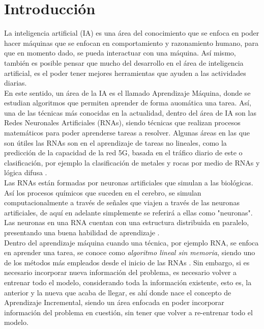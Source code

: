 \chapter{Introducción}
  La inteligencia artificial (IA) es una área del conocimiento que se enfoca en poder hacer máquinas que se enfocan en comportamiento y razonamiento humano, para que en momento dado, se pueda interactuar con una máquina. Así mismo, también es posible pensar que mucho del desarrollo en el área de inteligencia artificial, es el poder tener mejores herramientas que ayuden a las actividades diarias.\\

  En este sentido, un área de la IA es el llamado Aprendizaje Máquina, donde se estudian algoritmos que permiten aprender de forma auomática una tarea.
  Así, una de las técnicas más conocidas en la actualidad, dentro del área de IA son las Redes Neuronales Artificiales (RNAs), siendo técnicas que realizan procesos matemáticos para poder aprenderse tareas a resolver. Algunas áreas en las que son útiles las RNAs son en el aprendizaje de tareas no lineales, como la predicción de la capacidad de la red 5G, basada en el tráfico diario de este \cite{zhao2022} o clasificación, por ejemplo la clasificación de metales y rocas por medio de RNAs y lógica difusa \cite{salazar2013}. \\

  Las RNAs están formadas por neuronas artificiales que simulan a las biológicas. Así los procesos químicos que suceden en el cerebro, se simulan computacionalmente a través de señales que viajen a través de las neuronas artificiales, de aquí en adelante simplemente se referirá a ellas como "neuronas". Las neuronas en una RNA cuentan con una estructura distribuida en paralelo, presentando una buena habilidad de aprendizaje \cite{liu2015}.\\

  Dentro del aprendizaje máquina cuando una técnica, por ejemplo RNA, se enfoca en aprender una tarea, se conoce como \textit{algoritmo lineal sin memoria}, siendo uno de los métodos más empleados desde el inicio de las RNAs \cite{GiraudCarrier2000}. Sin embargo, si es necesario incorporar nueva información del problema,  es necesario volver a entrenar todo el modelo, considerando toda la información existente, esto es, la anterior y la nueva que acaba de llegar, es ahí donde nace el concepto de Aprendizaje Incremental, siendo un área enfocada en poder incorporar información del problema en cuestión, sin tener que volver a re-entrenar todo el modelo.\\


